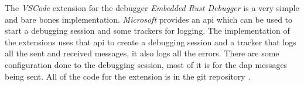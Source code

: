 The \emph{VSCode} extension for the debugger \emph{Embedded Rust Debugger} is a very simple and bare bones implementation.
\emph{Microsoft} provides an \gls{api} which can be used to start a debugging session and some trackers for logging.
The implementation of the extensions uses that \gls{api} to create a debugging session and a tracker that logs all the sent and received messages, it also logs all the errors.
There are some configuration done to the debugging session, most of it is for the \gls{dap} messages being sent.
All of the code for the extension is in the git repository \cite{erd-vscode}.

